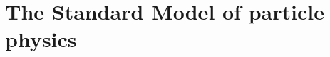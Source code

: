 \begin{comment}
%

\end{comment}


\chapter{The Standard Model of particle physics}
\label{chap:Introduction}




